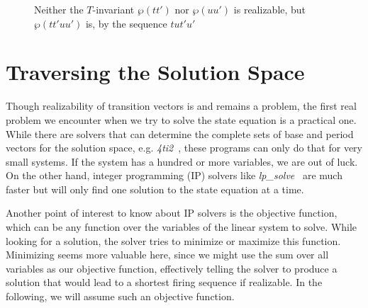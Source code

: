\documentclass{LMCS}
\newcommand{\parikh}{\wp}
\begin{document}
\begin{figure}[tb]
\centering
{}
\caption{\label{f.tinv2}Neither the $T$-invariant $\parikh(tt')$ nor $\parikh(uu')$ is realizable, but $\parikh(tt'uu')$ is, 
	by the sequence $tut'u'$}
\end{figure}

\section{Traversing the Solution Space}\label{sec3}

Though realizability of transition vectors is and remains a problem, 
the first real problem we encounter when we try to solve the
state equation is a practical one. While there are solvers that can determine the complete sets of base
and period vectors for the solution space, e.g. {\em 4ti2}~\cite{4ti2}, these programs can only do that for very
small systems. If the system has a hundred or more variables, we are out of luck. On the other hand,
integer programming (IP) solvers like {\em lp\_solve}~\cite{lpsolve} are much faster but will only find one solution 
to the state equation at a time. 

Another point of interest to know about IP solvers is the objective
function, which can be any function over the variables of the linear system to solve. 
While looking for a solution, the solver tries to minimize or maximize this function. Minimizing seems more
valuable here, since we might use the sum over all variables as our objective function, effectively telling
the solver to produce a solution that would lead to a shortest firing sequence if realizable.
In the following, we will assume such an objective function.
\end{document}
